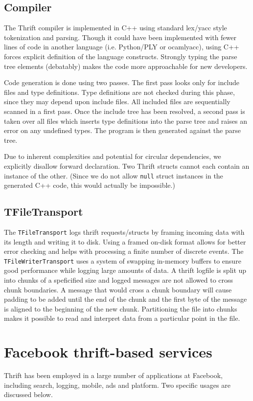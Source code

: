 \documentclass[nocopyrightspace,blockstyle]{sigplanconf}
\begin{document}
\subsection{Compiler}
The Thrift compiler is implemented in C++ using standard lex/yacc style
tokenization and parsing. Though it could have been implemented with fewer
lines of code in another language (i.e. Python/PLY or ocamlyacc), using C++
forces explicit definition of the language constructs. Strongly typing the
parse tree elements (debatably) makes the code more approachable for new
developers.

Code generation is done using two passes. The first pass looks only for
include files and type definitions. Type definitions are not checked during
this phase, since they may depend upon include files. All included files
are sequentially scanned in a first pass. Once the include tree has been
resolved, a second pass is taken over all files which inserts type definitions
into the parse tree and raises an error on any undefined types. The program is
then generated against the parse tree.

Due to inherent complexities and potential for circular dependencies,
we explicitly disallow forward declaration. Two Thrift structs cannot
each contain an instance of the other. (Since we do not allow \texttt{null}
struct instances in the generated C++ code, this would actually be impossible.)

\subsection{TFileTransport}
The \texttt{TFileTransport} logs thrift requests/structs by 
framing incoming data with its length and writing it to disk. 
Using a framed on-disk format allows for better error checking and 
helps with processing a finite number of discrete events. The 
\texttt{TFileWriterTransport} uses a system of swapping in-memory buffers 
to ensure good performance while logging large amounts of data. 
A thrift logfile is split up into chunks of a speficified size and logged messages
are not allowed to cross chunk boundaries. A message that would cross a chunk 
boundary will cause padding to be added until the end of the chunk and the 
first byte of the message is aligned to the beginning of the new chunk.
Partitioning the file into chunks makes it possible to read and interpret data 
from a particular point in  the file. 

\section{Facebook thrift-based services}
Thrift has been employed in a large number of applications at Facebook, including
search, logging, mobile, ads and platform. Two specific usages are discussed below.
\end{document}
